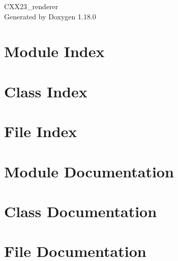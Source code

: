 \documentclass[twoside]{book}
\newcommand{\+}{\discretionary{\mbox{\scriptsize$\hookleftarrow$}}{}{}}
\newcommand{\clearemptydoublepage}{%
    \newpage{\pagestyle{empty}\cleardoublepage}%
  }
\begin{document}
  \raggedbottom
    \hypersetup{pageanchor=false,
                bookmarksnumbered=true,
                pdfencoding=unicode
               }
  \begin{titlepage}
  \vspace*{7cm}
  \begin{center}%
  {\Large CXX23\+\_\+renderer}\\
  \vspace*{1cm}
  {\large Generated by Doxygen 1.18.0}\\
  \end{center}
  \end{titlepage}
  \clearemptydoublepage
  \tableofcontents
  \clearemptydoublepage
  \hypersetup{pageanchor=true}

\chapter{Module Index}

\chapter{Class Index}

\chapter{File Index}

\chapter{Module Documentation}


\chapter{Class Documentation}









\chapter{File Documentation}





  \backmatter
  \newpage
  \clearemptydoublepage
  \printindex
\end{document}
